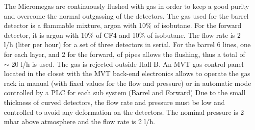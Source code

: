 The Micromegas are continuously flushed with gas in order to keep a good purity and overcome the normal outgassing of 
the detectors. The gas used for the barrel detector is a flammable mixture, argon with 10\% of isobutane. For the 
forward detector, it is argon with 10\% of CF4 and 10\% of isobutane. The flow rate is 2 l/h (liter per hour) for a set 
of three detectors in serial. For the barrel 6 lines, one for each layer, and 2 for the forward, of pipes allows the 
flushing, thus a total of $\sim$ 20 l/h is used.  The gas is rejected outside Hall B. An MVT gas control panel located 
in the closet with the MVT back-end electronics allows to operate the gas rack in manual (with fixed values for the 
flow and pressure) or in automatic mode controlled by a PLC for each sub system (Barrel and Forward) Due to the small 
thickness of curved detectors, the flow rate and pressure must be low and controlled to avoid any deformation on the 
detectors. The nominal pressure is 2 mbar above atmosphere and the flow rate is 2 l/h.